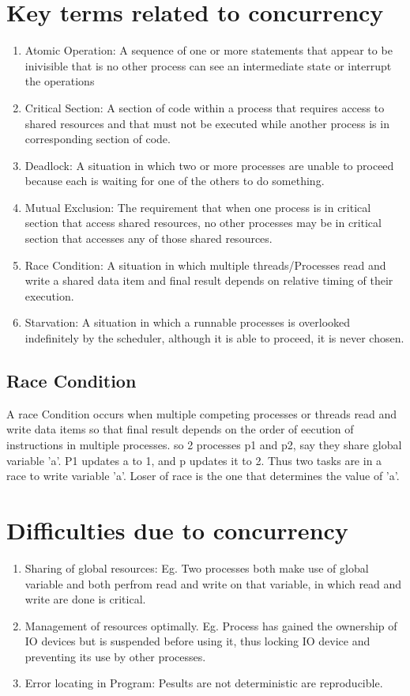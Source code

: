\documentclass[11pt]{article}
\begin{document}
\section{Key terms related to concurrency}

\begin{enumerate}
    \item Atomic Operation: A sequence of one or more statements that appear to be inivisible that is no other process can see an intermediate state or interrupt the operations
    \item Critical Section: A section of code within a process that requires access to shared resources and that must not be executed while another process is in corresponding section of code. 
    \item Deadlock: A situation in which two or more processes are unable to proceed because each is waiting for one of the others to do something. 
    \item Mutual Exclusion: The requirement that when one process is in critical section that access shared resources, no other processes may be in critical section that accesses any of those shared resources. 
    \item Race Condition: A situation in which multiple threads/Processes read and write a shared data item and final result depends on relative timing of their execution. 
    \item Starvation: A situation in which a runnable processes is overlooked indefinitely by the scheduler, although it is able to proceed, it is never chosen. 
\end{enumerate}

\subsection{Race Condition}
A race Condition occurs when multiple competing processes or threads read and write data items so that final result depends on the order of eecution of instructions in multiple processes. so 2 processes p1 and p2, say they share global variable 'a'. P1 updates a to 1, and p updates it to 2. Thus two tasks are in a race to write variable 'a'. Loser of race is the one that determines the value of 'a'.

\section{Difficulties due to concurrency}
\begin{enumerate}
    \item Sharing of global resources: Eg. Two processes both make use of global variable and both perfrom read and write on that variable, in which read and write are done is critical. 
    \item Management of resources optimally. Eg. Process has gained the ownership of IO devices but is suspended before using it, thus locking IO device and preventing its use by other processes. 
    \item Error locating in Program: Pesults are not deterministic are reproducible. 
\end{enumerate}
\end{document}
